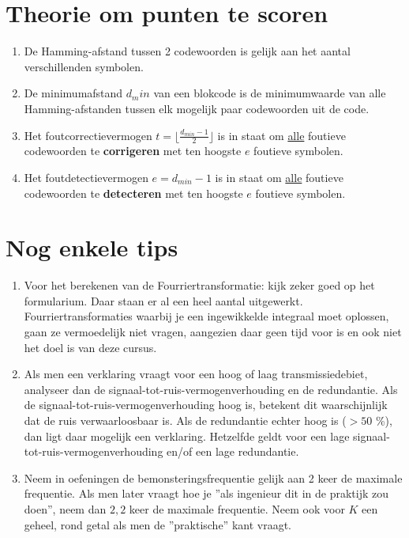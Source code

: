 \documentclass[12pt,a4paper]{article}
\begin{document}
\section*{Theorie om punten te scoren}
\begin{enumerate}
	\item De Hamming-afstand tussen 2 codewoorden is gelijk aan het aantal verschillenden symbolen.
	\item De minimumafstand $d_min$ van een blokcode is de minimumwaarde van alle Hamming-afstanden tussen elk mogelijk paar codewoorden uit de code.
	\item Het foutcorrectievermogen $t= \lfloor \frac{d_{min}-1}{2} \rfloor$ is in staat om \underline{alle} foutieve codewoorden te \textbf{corrigeren} met ten hoogste $e$ foutieve symbolen.
	\item Het foutdetectievermogen $e=d_{min}-1$ is in staat om \underline{alle} foutieve codewoorden te \textbf{detecteren} met ten hoogste $e$ foutieve symbolen.
\end{enumerate}

\section*{Nog enkele tips}
\begin{enumerate}
	\item Voor het berekenen van de Fourriertransformatie: kijk zeker goed op het formularium. Daar staan er al een heel aantal uitgewerkt. Fourriertransformaties waarbij je een ingewikkelde integraal moet oplossen, gaan ze vermoedelijk niet vragen, aangezien daar geen tijd voor is en ook niet het doel is van deze cursus.
	      
	\item Als men een verklaring vraagt voor een hoog of laag transmissiedebiet, analyseer dan de signaal-tot-ruis-vermogenverhouding en de redundantie. Als de signaal-tot-ruis-vermogenverhouding hoog is, betekent dit waarschijnlijk dat de ruis verwaarloosbaar is. Als de redundantie echter hoog is ($>50$ \%), dan ligt daar mogelijk een verklaring. Hetzelfde geldt voor een lage signaal-tot-ruis-vermogenverhouding en/of een lage redundantie.
	      
	\item Neem in oefeningen de bemonsteringsfrequentie gelijk aan 2 keer de maximale frequentie. Als men later vraagt hoe je ''als ingenieur dit in de praktijk zou doen'', neem dan $2,2$ keer de maximale frequentie. Neem ook voor $K$ een geheel, rond getal als men de ''praktische'' kant vraagt.
\end{enumerate}
\end{document}
